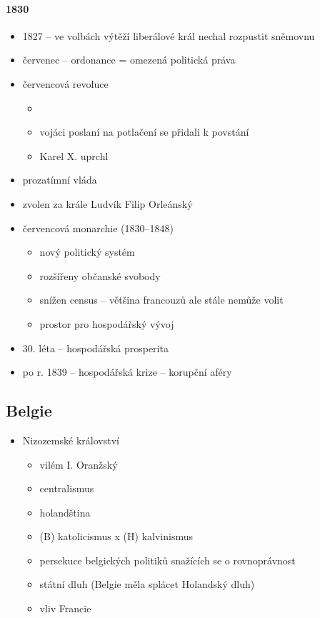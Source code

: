 \paragraph{1830}
\begin{itemize}
\item 1827 -- ve volbách výtěží liberálové \ra král nechal rozpustit sněmovnu
\item červenec -- ordonance = omezená politická práva
\item červencová revoluce
	\begin{itemize}
	\item {}
	\item vojáci poslaní na potlačení se přidali k povstání
	\item[\ra] Karel X. uprchl
	\end{itemize}
\item prozatímní vláda
\item zvolen za krále Ludvík Filip Orleánský
\item červencová monarchie (1830--1848)
	\begin{itemize}
	\item nový politický systém
	\item rozšířeny občanské svobody
	\item snížen census -- většina francouzů ale stále nemůže volit
	\item prostor pro hospodářský vývoj
	\end{itemize}
\item 30. léta -- hospodářská prosperita
\item po r. 1839 -- hospodářská krize -- korupční aféry

\end{itemize}

\subsection{Belgie}
\begin{itemize}
\item Nizozemské království
	\begin{itemize}
	\item vilém I. Oranžský
	\item centralismus
	\item holandština
	\item (B) katolicismus x (H) kalvinismus
	\item persekuce belgických politiků snažících se o rovnoprávnost
	\item státní dluh (Belgie měla splácet Holandský dluh)
	\item vliv Francie
	\end{itemize}
\end{itemize}

